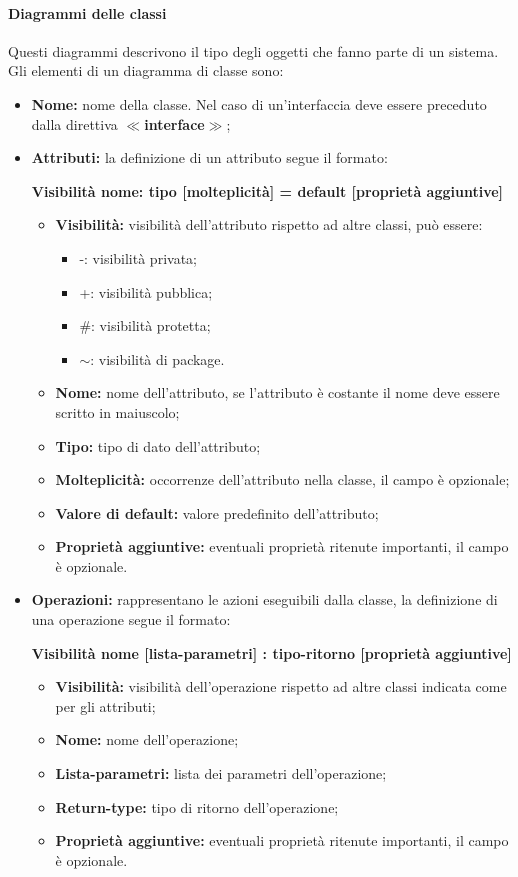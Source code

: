 \paragraph*{Diagrammi delle classi}
Questi diagrammi descrivono il tipo degli oggetti che fanno parte di un sistema.\\
Gli elementi di un diagramma di classe sono:
\begin{itemize}
	\item \textbf{Nome:} nome della classe. Nel caso di un'interfaccia deve essere preceduto dalla direttiva \textbf{$\ll$interface$\gg$};
	\item \textbf{Attributi:} la definizione di un attributo segue il formato:
	\begin{center}
		\textbf{Visibilità nome: tipo [molteplicità] = default [proprietà aggiuntive]}
	\end{center}
	\begin{itemize}
		\item \textbf{Visibilità:} visibilità dell'attributo rispetto ad altre classi, può essere:
		\begin{itemize}
			\item -: visibilità privata;
			\item +: visibilità pubblica;
			\item \#: visibilità protetta;
			\item $\sim$: visibilità di package.
		\end{itemize}
		\item \textbf{Nome:} nome dell'attributo, se l'attributo è costante il nome deve essere scritto in maiuscolo;
		\item \textbf{Tipo:} tipo di dato dell'attributo;
		\item \textbf{Molteplicità:} occorrenze dell'attributo nella classe, il campo è opzionale;
		\item \textbf{Valore di default:} valore predefinito dell'attributo;
		\item \textbf{Proprietà aggiuntive:} eventuali proprietà ritenute importanti, il campo è opzionale.
	\end{itemize}
	\item \textbf{Operazioni:} rappresentano le azioni eseguibili dalla classe, la definizione di una operazione segue il formato:
	\begin{center}
		\textbf{Visibilità nome [lista-parametri] : tipo-ritorno [proprietà aggiuntive]}
	\end{center}
	\begin{itemize}
		\item \textbf{Visibilità:} visibilità dell'operazione rispetto ad altre classi indicata come per gli attributi;
		\item \textbf{Nome:} nome dell'operazione;
		\item \textbf{Lista-parametri:} lista dei parametri dell'operazione;
		\item \textbf{Return-type:} tipo di ritorno dell'operazione;
		\item \textbf{Proprietà aggiuntive:} eventuali proprietà ritenute importanti, il campo è opzionale.
	\end{itemize}
\end{itemize} 
